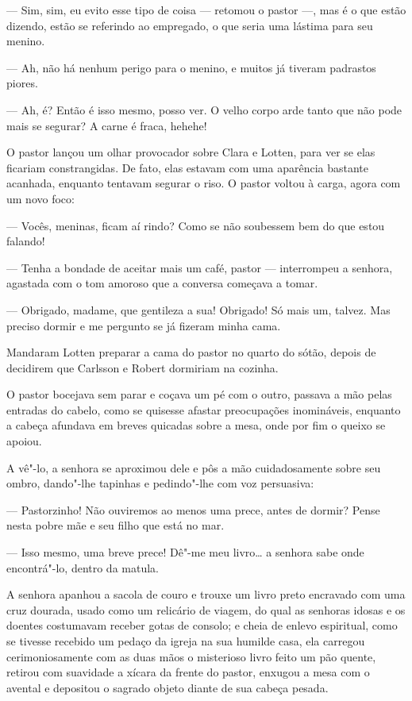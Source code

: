 --- Sim, sim, eu evito esse tipo de coisa --- retomou o pastor ---, mas é o que
estão dizendo, estão se referindo ao empregado, o que seria uma lástima para seu
menino.

--- Ah, não há nenhum perigo para o menino, e muitos já tiveram padrastos
piores.

--- Ah, é? Então é isso mesmo, posso ver. O velho corpo arde tanto que não pode
mais se segurar? A carne é fraca, hehehe!

O pastor lançou um olhar provocador sobre Clara e Lotten, para ver se elas
ficariam constrangidas. De fato, elas estavam com uma aparência bastante acanhada,
enquanto tentavam segurar o riso. O pastor voltou à carga, agora com um novo
foco:

--- Vocês, meninas, ficam aí rindo? Como se não soubessem bem do que estou falando!

--- Tenha a bondade de aceitar mais um café, pastor --- interrompeu a senhora,
agastada com o tom amoroso que a conversa começava a tomar.

--- Obrigado, madame, que gentileza a sua! Obrigado! Só mais um, talvez. Mas
preciso dormir e me pergunto se já fizeram minha cama.

Mandaram Lotten preparar a cama do pastor no quarto do sótão, depois de decidirem que
Carlsson e Robert dormiriam na cozinha.

O pastor bocejava sem parar e coçava um pé com o outro, passava a mão pelas entradas
do cabelo, como se quisesse afastar preocupações inomináveis, enquanto a cabeça
afundava em breves quicadas sobre a mesa, onde por fim o queixo se apoiou.

A vê"-lo, a senhora se aproximou dele e pôs a mão cuidadosamente sobre seu ombro,
dando"-lhe tapinhas e pedindo"-lhe com voz persuasiva:

--- Pastorzinho! Não ouviremos ao menos uma prece, antes de dormir? Pense nesta
pobre mãe e seu filho que está no mar.

--- Isso mesmo, uma breve prece! Dê"-me meu livro\ldots{} a senhora sabe onde
encontrá"-lo, dentro da matula.

A senhora apanhou a sacola de couro e trouxe um livro preto encravado com uma
cruz dourada, usado como um relicário de viagem, do qual
as senhoras idosas e os doentes costumavam receber gotas de consolo; e cheia de
enlevo espiritual, como se tivesse recebido um pedaço da igreja na sua humilde
casa, ela carregou cerimoniosamente com as duas mãos o misterioso livro feito um
pão quente, retirou com suavidade a xícara da frente do pastor, enxugou a mesa
com o avental e depositou o sagrado objeto diante de sua cabeça pesada.

